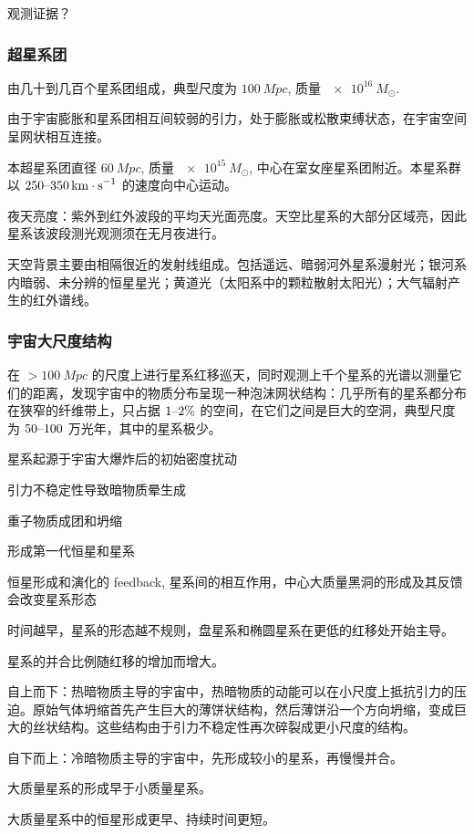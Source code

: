 \documentclass[../天体物理基础.tex]{subfiles}
\begin{document}
观测证据？

\subsubsection{超星系团}
由几十到几百个星系团组成，典型尺度为 $\qty{100}{Mpc}$, 质量 $\qty{e16}{M_{\odot}}$.

由于宇宙膨胀和星系团相互间较弱的引力，处于膨胀或松散束缚状态，在宇宙空间呈网状相互连接。

本超星系团直径 $\qty{60}{Mpc}$, 质量 $\qty{e15}{M_{\odot}}$, 中心在室女座星系团附近。本星系群以 $250\text{\textendash}\\\qty{350}{km\cdot{}s^{-1}}$ 的速度向中心运动。

夜天亮度：紫外到红外波段的平均天光面亮度。天空比星系的大部分区域亮，因此星系该波段测光观测须在无月夜进行。

天空背景主要由相隔很近的发射线组成。包括遥远、暗弱河外星系漫射光；银河系内暗弱、未分辨的恒星星光；黄道光（太阳系中的颗粒散射太阳光）；大气辐射产生的红外谱线。

\subsubsection{宇宙大尺度结构}

在 $>\qty{100}{Mpc}$ 的尺度上进行星系红移巡天，同时观测上千个星系的光谱以测量它们的距离，发现宇宙中的物质分布呈现一种泡沫网状结构：几乎所有的星系都分布在狭窄的纤维带上，只占据 $1\text{\textendash}2\%$ 的空间，在它们之间是巨大的空洞，典型尺度为 $50\text{\textendash}100$ 万光年，其中的星系极少。

星系起源于宇宙大爆炸后的初始密度扰动

引力不稳定性导致暗物质晕生成

重子物质成团和坍缩

形成第一代恒星和星系

恒星形成和演化的 feedback, 星系间的相互作用，中心大质量黑洞的形成及其反馈会改变星系形态

时间越早，星系的形态越不规则，盘星系和椭圆星系在更低的红移处开始主导。

星系的并合比例随红移的增加而增大。

自上而下：热暗物质主导的宇宙中，热暗物质的动能可以在小尺度上抵抗引力的压迫。原始气体坍缩首先产生巨大的薄饼状结构，然后薄饼沿一个方向坍缩，变成巨大的丝状结构。这些结构由于引力不稳定性再次碎裂成更小尺度的结构。

自下而上：冷暗物质主导的宇宙中，先形成较小的星系，再慢慢并合。

大质量星系的形成早于小质量星系。

大质量星系中的恒星形成更早、持续时间更短。


\end{document}
